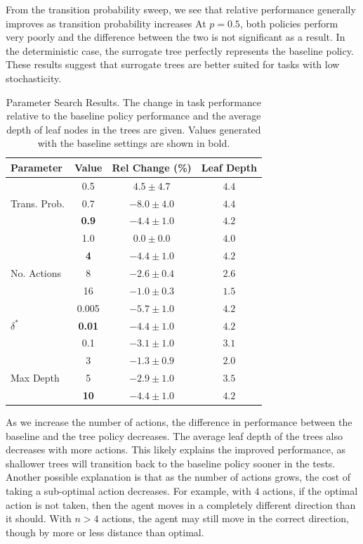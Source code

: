 \documentclass[letterpaper]{article} %
\begin{document}
From the transition probability sweep, we see that relative performance generally improves as transition probability increases
At $p=0.5$, both policies perform very poorly and the difference between the two is not significant as a result.
In the deterministic case, the surrogate tree perfectly represents the baseline policy.
These results suggest that surrogate trees are better suited for tasks with low stochasticity.
\begin{table}[t]
    \centering
    \begin{tabular}{@{}l c c c@{}}
        \toprule
        Parameter & Value & Rel Change (\%) & Leaf Depth \\
        \midrule
        \multirow[c]{3}{*}{Trans. Prob.} & 0.5 & $4.5 \pm 4.7$ & $4.4$ \\
        & 0.7 & $-8.0 \pm 4.0$ & $4.4$ \\
        & \textbf{0.9} & $\mathbf{-4.4 \pm 1.0}$ & $\mathbf{4.2}$ \\
        & 1.0 & $0.0 \pm 0.0$ & $4.0$ \\
        \midrule
        \multirow[c]{3}{*}{No. Actions} & \textbf{4} & $\mathbf{-4.4 \pm 1.0}$ & $\mathbf{4.2}$ \\
        & 8 & $-2.6 \pm 0.4$ & $2.6$ \\
        & 16 & $-1.0 \pm 0.3$ & $1.5$ \\
        \midrule
        \multirow[c]{3}{*}{$\delta^*$} & 0.005 & $-5.7 \pm 1.0$ & $4.2$ \\
        & \textbf{0.01} & $\mathbf{-4.4 \pm 1.0}$ & $\mathbf{4.2}$ \\
        & 0.1 & $-3.1 \pm 1.0$ & $3.1$ \\
        \midrule
        \multirow[c]{3}{*}{Max Depth} & 3 & $-1.3 \pm 0.9$ & $2.0$ \\
        & 5 & $-2.9 \pm 1.0$ & $3.5$ \\
        & \textbf{10} & $\mathbf{-4.4 \pm 1.0}$ & $\mathbf{4.2}$ \\
        \bottomrule
    \end{tabular}
    \caption{Parameter Search Results. The change in task performance relative to the baseline policy performance and the average depth of leaf nodes in the trees are given. Values generated with the baseline settings are shown in bold.}
    \label{tab: grid results}
\end{table}

As we increase the number of actions, the difference in performance between the baseline and the tree policy decreases.
The average leaf depth of the trees also decreases with more actions.
This likely explains the improved performance, as shallower trees will transition back to the baseline policy sooner in the tests.
Another possible explanation is that as the number of actions grows, the cost of taking a sub-optimal action decreases.
For example, with $4$ actions, if the optimal action is not taken, then the agent moves in a completely different direction than it should.
With $n>4$ actions, the agent may still move in the correct direction, though by more or less distance than optimal.
\end{document}
